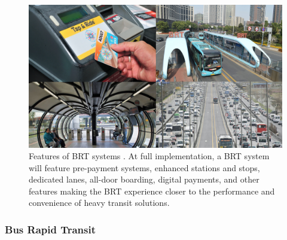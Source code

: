 {{        \begin{figure}[!htb]
            \begin{center}
                \includegraphics[width=1\textwidth]{chapters/consensus/BRT/figures/brt7.jpeg}
            \end{center}
            \caption{Features of BRT systems \cite{Aboutthe77:online}. At full implementation, a BRT system will feature pre-payment systems, enhanced stations and stops, dedicated lanes, all-door boarding, digital payments, and other features making the BRT experience closer to the performance and convenience of heavy transit solutions.}
            \label{fig:brt_what_is_BRT}
        \end{figure}


        \subsubsection{Bus Rapid Transit}

}}
